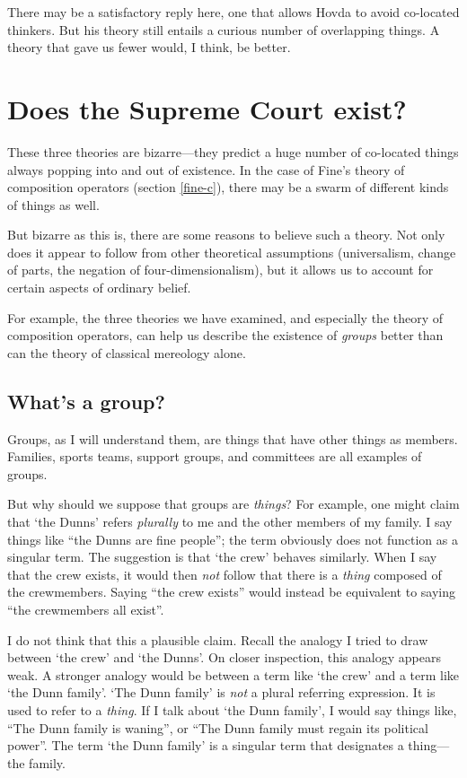 \documentclass[11pt]{article}
\begin{document}
\begin{spacing}{1.5}
There may be a satisfactory reply here, one that allows Hovda to avoid
co-located thinkers.  But his theory still entails a curious number of
overlapping things.  A theory that gave us fewer would, I think, be
better.

\section{Does the Supreme Court exist?}
\label{groups}
These three theories are bizarre---they predict a huge number of
co-located things always popping into and out of existence.  In the
case of Fine's theory of composition operators (section \ref{fine-c}),
there may be a swarm of different kinds of things as well.  

But bizarre as this is, there are some reasons to believe such a
theory.  Not only does it appear to follow from other theoretical
assumptions (universalism, change of parts, the negation of
four-dimensionalism), but it allows us to account for certain aspects
of ordinary belief.

For example, the three theories we have examined, and especially the
theory of composition operators, can help us describe the existence of
{\em groups} better than can the theory of classical mereology alone.

\subsection{What's a group?}
\label{what-g}
Groups, as I will understand them, are things that have other things
as members.  Families, sports teams, support groups, and committees
are all examples of groups.

But why should we suppose that groups are {\em things}?  For example,
one might claim that `the Dunns' refers {\em plurally} to me and the
other members of my family.  I say things like ``the Dunns are fine
people''; the term obviously does not function as a singular term.
The suggestion is that `the crew' behaves similarly.  When I say that
the crew exists, it would then {\em not} follow that there is a {\em
  thing} composed of the crewmembers.  Saying ``the crew exists''
would instead be equivalent to saying ``the crewmembers all exist''.

I do not think that this a plausible claim.  Recall the analogy I
tried to draw between `the crew' and `the Dunns'.  On closer
inspection, this analogy appears weak.  A stronger analogy would be
between a term like `the crew' and a term like `the Dunn family'.
`The Dunn family' is {\em not} a plural referring expression.  It is
used to refer to a {\em thing}.  If I talk about `the Dunn family', I
would say things like, ``The Dunn family is waning'', or ``The Dunn
family must regain its political power''.  The term `the Dunn family'
is a singular term that designates a thing---the family.


\end{spacing}
\end{document}
